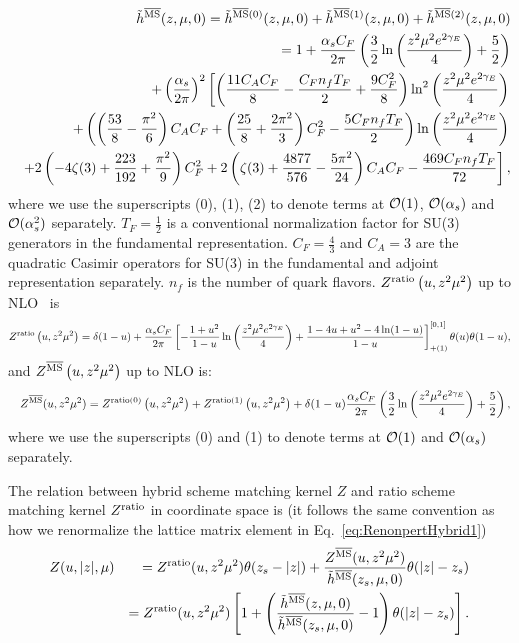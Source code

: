 \documentclass[prd,aps,twocolumn,preprintnumbers, showpacs, nofootinbib,superscriptaddress,notitlepage]{revtex4-2}
\def\bea{\begin{eqnarray}}
\def\eea{\end{eqnarray}}
\begin{document}
\bea\label{eq:MSbarpert}
&&\tilde{h}^{\overline{\rm MS}}(z, \mu, 0)= \tilde{h}^{\overline{\rm MS}(0)}(z, \mu, 0)+\tilde{h}^{\overline{\rm MS}(1)}(z, \mu, 0)+\tilde{h}^{\overline{\rm MS}(2)}(z, \mu, 0)\nonumber\\
&&=1+\frac{\alpha_{s}C_{F}}{2 \pi}\left(\frac{3}{2}\ln\left(\frac{z^{2}\mu^{2}e^{2\gamma_E}}{4}\right)+\frac{5}{2}\right) \nonumber\\
&&+\left(\frac{\alpha_s}{2\pi}\right)^2\left[\left(\frac{11 C_A C_F}{8}-\frac{C_F n_f T_F}{2}+\frac{9 C_F^2}{8}\right) \ln^2 \left(\frac{z^{2}\mu^{2}e^{2\gamma_E}}{4}\right) \right.\nonumber\\
&&\left.+\left(\left(\frac{53}{8}-\frac{\pi ^2}{6}\right) C_A C_F+\left(\frac{25}{8}+\frac{2\pi ^2}{3}\right) C_F^2 -\frac{5 C_F n_f T_F}{2}\right) \ln \left(\frac{z^{2}\mu^{2}e^{2\gamma_E}}{4}\right) \right. \nonumber\\
&&\left.+2 \left(-4 \zeta (3)+\frac{223}{192} +\frac{\pi^2}{9}\right) C_F^2 +2\left(\zeta (3)+\frac{4877}{576}-\frac{5\pi ^2}{24}\right) C_A C_F-\frac{469 C_F n_f T_F}{72}\right],
\eea
where we use the superscripts (0), (1), (2) to denote terms at ${\cal O}(1)$, ${\cal O}(\alpha_s)$ and ${\cal O}(\alpha_s^2)$ separately. $T_F=\frac{1}{2}$ is a conventional normalization factor for SU(3) generators in the fundamental representation. $C_{F}=\frac{4}{3}$ and $C_{A}=3$ are the quadratic Casimir operators for SU(3) in the fundamental and adjoint representation separately. $n_f$ is the number of quark flavors. $Z^{\rm ratio}\left(u,z^{2} \mu^{2}\right)$ up to NLO~\cite{Radyushkin:2018cvn,Zhang:2018ggy,Izubuchi:2018srq} is
\bea
Z^{\rm ratio}\left(u,z^{2} \mu^{2}\right)= \delta(1-u)+\frac{\alpha_{s} C_{F}}{2 \pi}\left[-\frac{1+u^{2}}{1-u} \ln\left( \frac{ z^2 \mu^2 e^{2 \gamma_{E}} }{4} \right) +\frac{1-4 u+u^{2}-4 \ln (1-u)}{1-u}\right]_{+(1)}^{[0,1]} \theta(u)\theta(1-u),
\eea
and $Z^{\overline{\rm MS}}\left(u,z^{2} \mu^{2}\right)$ up to NLO is:
\bea\label{eq:MSbarkernelNLOcoor}
&&Z^{\overline{\rm MS}}(u,z^2 \mu^2)=
Z^{\rm ratio(0)}\left(u,z^{2} \mu^{2}\right) + Z^{\rm ratio(1)}\left(u,z^{2} \mu^{2}\right) + \delta(1-u)\frac{\alpha_{s} C_{F}}{2 \pi}\left(\frac{3}{2}\ln\left(\frac{z^{2}\mu^{2}e^{2\gamma_E}}{4}\right)+\frac{5}{2}\right),
\eea
where we use the superscripts (0) and (1) to denote terms at ${\cal O}(1)$ and ${\cal O}(\alpha_s)$ separately.

The relation between hybrid scheme matching kernel $Z$ and ratio scheme matching kernel $Z^{\rm ratio}$ in coordinate space is (it follows the same convention as how we renormalize the lattice matrix element in Eq.~\eqref{eq:RenonpertHybrid1})
\bea\label{eq:hybridratio}
Z(u,|z|,\mu)&&=Z^{\rm ratio}(u,z^2\mu^2)\theta(z_s-|z|) + \frac{Z^{\overline{\rm MS}}(u,z^2\mu^2)}{\tilde{h}^{\overline{\rm MS}}(z_s, \mu, 0)}\theta(|z|-z_s) \nonumber\\
&&= Z^{\rm ratio}(u,z^2\mu^2)\left[1 + \left(\frac{\tilde{h}^{\overline{\rm MS}}(z, \mu, 0)}{\tilde{h}^{\overline{\rm MS}}(z_s, \mu, 0)}-1\right)\theta(|z|-z_s)\right].
\eea
\end{document}
